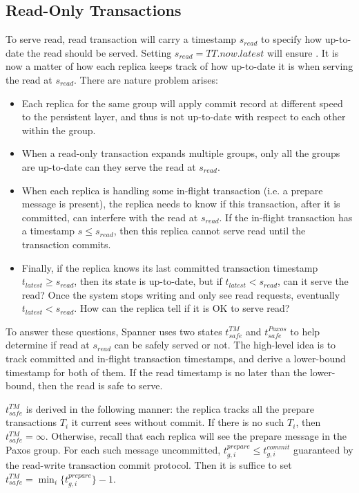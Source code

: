 \subsection{Read-Only Transactions}
To serve read, read transaction will carry a timestamp $s_{read}$ to specify
how up-to-date the read should be served. Setting $s_{read} = TT.now.latest$
will ensure {\Lconsistent}. It is now a matter of how each replica keeps
track of how up-to-date it is when serving the read at $s_{read}$.
There are nature problem arises:
\begin{itemize}
   \item Each replica for the same group will apply commit record at different
      speed to the persistent layer, and thus is not up-to-date with respect to each other within
      the group.
   \item When a read-only transaction expands multiple groups, only all the
      groups are up-to-date can they serve the read at $s_{read}$.
   \item When each replica is handling some in-flight transaction (i.e. a
      prepare message is present), the replica needs to know if this
      transaction, after it is committed, can interfere with the read at
      $s_{read}$. If the in-flight transaction has a timestamp $s \le
      s_{read}$, then this replica cannot serve read until the transaction
      commits.
   \item Finally, if the replica knows its last committed transaction timestamp
      $t_{latest} \ge s_{read}$, then its state is up-to-date, but if
      $t_{latest} < s_{read}$, can it serve the read? Once the system stops
      writing and only see read requests, eventually $t_{latest} < s_{read}$.
      How can the replica tell if it is OK to serve read?
\end{itemize}

To answer these questions, Spanner uses two states $t_{safe}^{TM}$ and
$t_{safe}^{Paxos}$ to help determine if read at $s_{read}$ can be safely served
or not. The high-level idea is to track committed and in-flight transaction
timestamps, and derive a lower-bound timestamp for both of them. If the read
timestamp is no later than the lower-bound, then the read is safe to serve.

$t_{safe}^{TM}$ is derived in the following manner: the replica tracks all the
prepare transactions $T_i$ it current sees without commit. If there is no such
$T_i$, then $t_{safe}^{TM} = \infty$. Otherwise, recall that each replica will
see the prepare message in the Paxos group. For each such message uncommitted,
$t_{g, i}^{prepare} \le t_{g, i}^{commit}$ guaranteed by the read-write
transaction commit protocol. Then it is suffice to set $t_{safe}^{TM}
=\min_i\{t_{g, i}^{prepare}\} - 1$.


